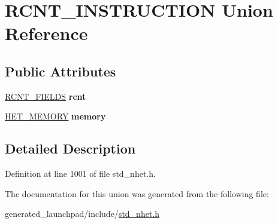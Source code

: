 \hypertarget{unionRCNT__INSTRUCTION}{}\section{R\+C\+N\+T\+\_\+\+I\+N\+S\+T\+R\+U\+C\+T\+I\+ON Union Reference}
\label{unionRCNT__INSTRUCTION}
\subsection*{Public Attributes}
\begin{DoxyCompactItemize}
\item 
\mbox{\label{unionRCNT__INSTRUCTION_abd1c49980cb531dccd1911e345b2bf51}} 
\mbox{\hyperlink{structrcnt__format}{R\+C\+N\+T\+\_\+\+F\+I\+E\+L\+DS}} {\bfseries rcnt}
\item 
\mbox{\label{unionRCNT__INSTRUCTION_a8e518cd12fe666888162636bf5e33469}} 
\mbox{\hyperlink{structmemory__format}{H\+E\+T\+\_\+\+M\+E\+M\+O\+RY}} {\bfseries memory}
\end{DoxyCompactItemize}


\subsection{Detailed Description}


Definition at line 1001 of file std\+\_\+nhet.\+h.



The documentation for this union was generated from the following file\+:\begin{DoxyCompactItemize}
\item 
generated\+\_\+launchpad/include/\mbox{\hyperlink{std__nhet_8h}{std\+\_\+nhet.\+h}}\end{DoxyCompactItemize}

